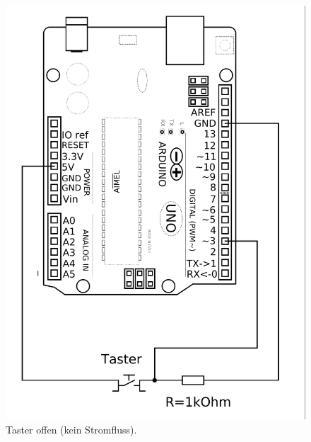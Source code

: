 \documentclass[ngerman, 11pt]{scrreprt}
\begin{document}
	\begin{figure}[H]
		\hfill
		\begin{minipage}{0.4\textwidth}
			\includegraphics[width=\textwidth]{../Zeichnungen/taster-an-arduino.png}
			\caption{Taster offen (kein Stromfluss).}
		\end{minipage}
		\hfill
		\begin{minipage}{0.4\textwidth}

\end{minipage}
\end{figure}
\end{document}
